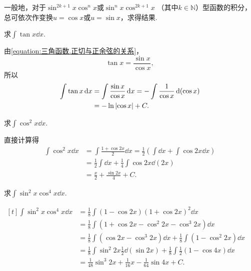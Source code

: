 \begin{remark}
一般地，对于\(\sin^{2k+1} x \cos^n x\)或\(\sin^n x \cos^{2k+1} x\)
（其中\(k\in\mathbb{N}\)）型函数的积分，
总可依次作变换\(u = \cos x\)或\(u = \sin x\)，求得结果.
\end{remark}

\begin{example}
求\(\int \tan x \dd{x}\).
\begin{solution}
由\cref{equation:三角函数.正切与正余弦的关系}，
\[
	\tan x = \frac{\sin x}{\cos x},
\]
所以\begin{align}
	\int \tan x \dd{x}
	&= \int \frac{\sin x}{\cos x} \dd{x}
	= - \int \frac{1}{\cos x} \dd(\cos x)
	\nonumber \\
	&= - \ln\abs{\cos x} + C.
\end{align}
\end{solution}
\end{example}

\begin{example}
求\(\int \cos^2 x \dd{x}\).
\begin{solution}
直接计算得
\begin{align*}
	\int \cos^2 x \dd{x}
	&= \int \frac{1 + \cos 2x}{2} \dd{x}
	= \frac{1}{2} \left( \int \dd{x} + \int \cos 2x \dd{x} \right) \\
	&= \frac{1}{2} \int \dd{x} + \frac{1}{4} \int \cos 2x \dd(2x) \\
	&= \frac{x}{2} + \frac{\sin 2x}{4} + C.
\end{align*}
\end{solution}
\end{example}

\begin{example}
求\(\int \sin^2 x \cos^4 x \dd{x}\).
\begin{solution}
\(\begin{aligned}[t]
	\int \sin^2 x \cos^4 x \dd{x}
	&= \frac{1}{8} \int (1 - \cos 2x) (1 + \cos 2x)^2 \dd{x} \\
	&= \frac{1}{8} \int (1 + \cos 2x - \cos^2 2x - \cos^3 2x) \dd{x} \\
	&= \frac{1}{8} \int (\cos 2x - \cos^3 2x) \dd{x}
		+ \frac{1}{8} \int (1 - \cos^2 2x) \dd{x} \\
	&= \frac{1}{8} \int \sin^2 2x \frac{1}{2} \dd(\sin 2x)
		+ \frac{1}{8} \int \frac{1}{2} (1 - \cos 4x) \dd{x} \\
	&= \frac{1}{48} \sin^3 2x + \frac{1}{16} x - \frac{1}{64} \sin 4x + C.
\end{aligned}\)
\end{solution}
\end{example}


